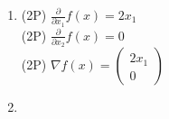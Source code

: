 {\color{solution}
\begin{enumerate}
\item \textcolor{exampoints}{(2P)}  $\frac{\partial}{\partial x_1} f(x) = 2x_1$\\
\textcolor{exampoints}{(2P)}  $\frac{\partial}{\partial x_2} f(x) = 0$\\
\textcolor{exampoints}{(2P)}  $\nabla f(x) = \begin{pmatrix}
 2x_1\\0
\end{pmatrix}$ 
	\item 
\end{enumerate}
}
